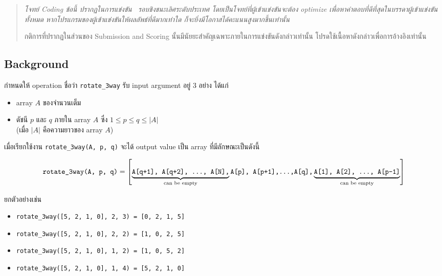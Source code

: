 
\begin{quote}
    \em
    \vphantom{~}\llap{\adfdownleafleft\;}โจทย์ Coding
    ข้อนี้ ปรากฏในการแข่งขัน \techjam\ รอบชิงชนะเลิศระดับประเทศ
    โดยเป็นโจทย์ที่ผู้เข้าแข่งขันจะต้อง optimize เพื่อหาคำตอบที่ดีที่สุดในบรรดาผู้เข้าแข่งขันทั้งหมด
    หากโปรแกรมของผู้เข้าแข่งขันให้ผลลัพธ์ที่ดีมากเท่าใด ก็จะยิ่งมีโอกาสได้คะแนนสูงมากขึ้นเท่านั้น

    กติการที่ปรากฏในส่วนของ Submission and Scoring นั้นมีนัยยะสำคัญเฉพาะภายในการแข่งขันดังกล่าวเท่านั้น
    โปรดใช้เนื้อหาดังกล่าวเพื่อการอ้างอิงเท่านั้น
\end{quote}

\subsection*{\sectionfont\upshape Background}

กำหนดให้ operation ชื่อว่า \lstinline|rotate_3way| รับ input argument อยู่ 3 อย่าง ได้แก่
\begin{itemize}
\item array $A$ ของจำนวนเต็ม
\item ดัชนี $p$ และ $q$ ภายใน array $A$ ซึ่ง $1 \leq p \leq q \leq |A|$ \\
    (เมื่อ $|A|$ คือความยาวของ array $A$)
\end{itemize}

เมื่อเรียกใช้งาน \lstinline|rotate_3way(A, p, q)| จะได้ output value เป็น array ที่มีลักษณะเป็นดังนี้
\begin{fullwidth}
    \vspace*{-\baselineskip}
    \[
        \text{\ttfamily rotate\_3way(A, p, q)} =
        \left[
        \underbrace{\text{\ttfamily A[q+1], A[q+2], \ldots, A[N],}}_\text{can be empty}
        \text{\ttfamily A[p], A[p+1],\ldots,A[q],} 
        \underbrace{\text{\ttfamily A[1], A[2], \ldots, A[p-1]}}_\text{can be empty}
        \right]    
    \]    
\end{fullwidth}

\noindent
ยกตัวอย่างเช่น
\begin{itemize}[itemsep=0pt]
\item \lstinline{rotate_3way([5, 2, 1, 0], 2, 3) = [0, 2, 1, 5]}
\item \lstinline{rotate_3way([5, 2, 1, 0], 2, 2) = [1, 0, 2, 5]}
\item \lstinline{rotate_3way([5, 2, 1, 0], 1, 2) = [1, 0, 5, 2]}
\item \lstinline{rotate_3way([5, 2, 1, 0], 1, 4) = [5, 2, 1, 0]}
\end{itemize}

